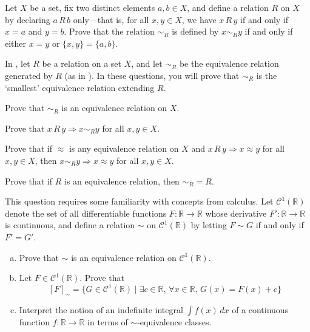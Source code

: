\begin{chapex}
\label{cqEquivalenceRelationGeneratedByRelationEnd}
Let $X$ be a set, fix two distinct elements $a,b \in X$, and define a relation $R$ on $X$ by declaring $a\,R\,b$ only---that is, for all $x,y \in X$, we have $x\,R\,y$ if and only if $x=a$ and $y=b$. Prove that the relation ${\sim}_R$ is defined by $x \sim_R y$ if and only if either $x=y$ or $\{x,y\} = \{a,b\}$.
\end{chapex}

In , let $R$ be a relation on a set $X$, and let $\sim_R$ be the equivalence relation generated by $R$ (as in ). In these questions, you will prove that $\sim_R$ is the `smallest' equivalence relation extending $R$.

\begin{chapex}
\label{cqPropertiesOfEquivalenceRelationGeneratedByRelationBegin}
Prove that ${\sim}_R$ is an equivalence relation on $X$.
\end{chapex}

\begin{chapex}
Prove that $x\,R\,y \Rightarrow x \sim_R y$ for all $x,y \in X$.
\end{chapex}

\begin{chapex}
Prove that if $\approx$ is any equivalence relation on $X$ and $x\,R\,y \Rightarrow x \approx y$ for all $x,y \in X$, then $x \sim_R y \Rightarrow x \approx y$ for all $x,y \in X$.
\end{chapex}

\begin{chapex}
\label{cqPropertiesOfEquivalenceRelationGeneratedByRelationEnd}
Prove that if $R$ is an equivalence relation, then ${\sim_R} = R$.
\end{chapex}

\begin{chapex}
\label{cqAntiderivativesIndefiniteIntegrals}
This question requires some familiarity with concepts from calculus. Let $\mathcal{C}^1(\mathbb{R})$ denote the set of all differentiable functions $F : \mathbb{R} \to \mathbb{R}$ whose derivative $F' : \mathbb{R} \to \mathbb{R}$ is continuous, and define a relation $\sim$ on $\mathcal{C}^1(\mathbb{R})$ by letting $F \sim G$ if and only if $F' = G'$.
\begin{enumerate}[(a)]
\item Prove that $\sim$ is an equivalence relation on $\mathcal{C}^1(\mathbb{R})$.
\item Let $F \in \mathcal{C}^1(\mathbb{R})$. Prove that
\[ [F]_{\sim} = \{ G \in \mathcal{C}^1(\mathbb{R}) \mid \exists c \in \mathbb{R},\, \forall x \in \mathbb{R},\, G(x) = F(x) + c \} \]
\item Interpret the notion of an indefinite integral $\displaystyle \int f(x)\, dx$ of a continuous function $f : \mathbb{R} \to \mathbb{R}$ in terms of $\sim$-equivalence classes.
\end{enumerate}
\end{chapex}

